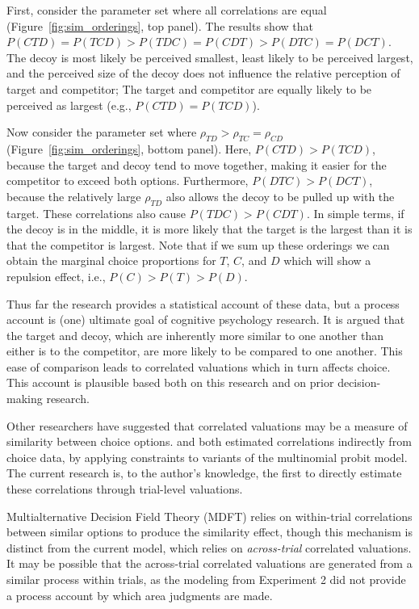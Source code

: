 First, consider the parameter set where all correlations are equal (Figure~\ref{fig:sim_orderings}, top panel). The results show that $P(CTD)=P(TCD)>P(TDC)=P(CDT)>P(DTC)=P(DCT)$. The decoy is most likely be perceived smallest, least likely to be perceived largest, and the perceived size of the decoy does not influence the relative perception of target and competitor; The target and competitor are equally likely to be perceived as largest (e.g., $P(CTD)=P(TCD)$).

Now consider the parameter set where $\rho_{TD}>\rho_{TC}=\rho_{CD}$ (Figure~\ref{fig:sim_orderings}, bottom panel). Here, $P(CTD)>P(TCD)$, because the target and decoy tend to move together, making it easier for the competitor to exceed both options. Furthermore, $P(DTC)>P(DCT)$, because the relatively large $\rho_{TD}$ also allows the decoy to be pulled up with the target. These correlations also cause $P(TDC)>P(CDT)$. In simple terms, if the decoy is in the middle, it is more likely that the target is the largest than it is that the competitor is largest. Note that if we sum up these orderings we can obtain the marginal choice proportions for $T$, $C$, and $D$ which will show a repulsion effect, i.e., $P(C)>P(T)>P(D)$. 

Thus far the research provides a statistical account of these data, but a process account is (one) ultimate goal of cognitive psychology research. It is argued that the target and decoy, which are inherently more similar to one another than either is to the competitor, are more likely to be compared to one another. This ease of comparison leads to correlated valuations which in turn affects choice. This account is plausible based both on this research and on prior decision-making research.

Other researchers have suggested that correlated valuations may be a measure of similarity between choice options. \textcite{kamakura1984predicting} and \textcite{natenzon2019random} both estimated correlations indirectly from choice data, by applying constraints to variants of the multinomial probit model. The current research is, to the author's knowledge, the first to directly estimate these correlations through trial-level valuations. 

Multialternative Decision Field Theory (MDFT) \parencite{roeMultialternativeDecisionField2001a} relies on within-trial correlations between similar options to produce the similarity effect, though this mechanism is distinct from the current model, which relies on \textit{across-trial} correlated valuations. It may be possible that the across-trial correlated valuations are generated from a similar process within trials, as the modeling from Experiment 2 did not provide a process account by which area judgments are made.

